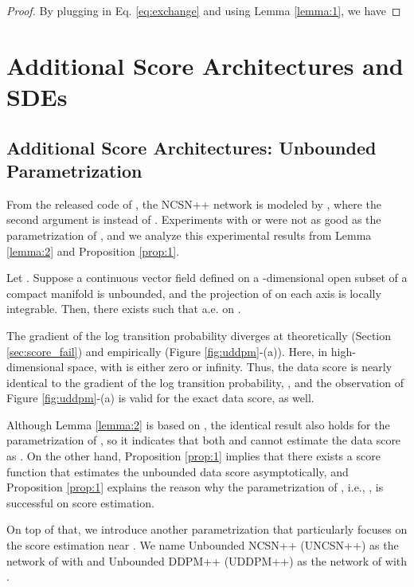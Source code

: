 \documentclass[nohyperref]{article}
\theoremstyle{plain}
\theoremstyle{definition}
\theoremstyle{remark}
\begin{document}
\begin{proof}
By plugging  in Eq. \eqref{eq:exchange} and using Lemma \ref{lemma:1}, we have

\end{proof}

\section{Additional Score Architectures and SDEs}

\subsection{Additional Score Architectures: Unbounded Parametrization}

From the released code of \citet{song2020score}, the NCSN++ network is modeled by , where the second argument is  instead of . Experiments with  or  were not as good as the parametrization of , and we analyze this experimental results from Lemma \ref{lemma:2} and Proposition \ref{prop:1}.

\begin{proposition}\label{prop:1}
		Let . Suppose a continuous vector field  defined on a -dimensional open subset  of a compact manifold  is unbounded, and the projection of  on each axis is locally integrable. Then, there exists  such that  a.e. on .
	\end{proposition}

The gradient of the log transition probability diverges at  theoretically (Section \ref{sec:score_fail}) and empirically (Figure \ref{fig:uddpm}-(a)). Here, in high-dimensional space,  with  is either zero or infinity. Thus, the data score is nearly identical to the gradient of the log transition probability, , and the observation of Figure \ref{fig:uddpm}-(a) is valid for the exact data score, as well.

Although Lemma \ref{lemma:2} is based on , the identical result also holds for the parametrization of , so it indicates that both  and  cannot estimate the data score as . On the other hand, Proposition \ref{prop:1} implies that there exists a score function that estimates the unbounded data score asymptotically, and Proposition \ref{prop:1} explains the reason why the parametrization of \citet{song2020score}, i.e., , is successful on score estimation.

On top of that, we introduce another parametrization that particularly focuses on the score estimation near . We name Unbounded NCSN++ (UNCSN++) as the network of  with  and Unbounded DDPM++ (UDDPM++) as the network of  with .
\end{document}
